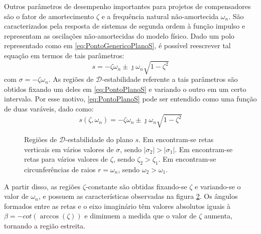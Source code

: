 Outros parâmetros de desempenho importantes para projetos de compensadores são o fator de amortecimento $\zeta$ e a frequência natural não-amortecida $\omega_n$. São caracterizados pela resposta de sistemas de segunda ordem à função impulso \cite{NISE2011}\cite{OGATA2011} e representam as oscilações não-amortecidas do modelo físico. Dado um polo representado como em \eqref{eq:PontoGenericoPlanoS}, é possível reescrever tal equação em termos de tais parâmetros:
\begin{equation}
  s = -\zeta\omega_n \pm \jmath\omega_n \sqrt {1-\zeta^2} \label{eq:PontoPlanoS}
\end{equation}
com $\sigma = -\zeta\omega_n$. As regiões de $\mathscr{D}$-estabilidade referente a tais parâmetros são obtidos fixando um deles em \eqref{eq:PontoPlanoS} e variando o outro em um certo intervalo. Por esse motivo, \eqref{eq:PontoPlanoS} pode ser entendido como uma função de duas varáveis, dado como:
\begin{equation}
  s(\zeta,\omega_n) = -\zeta\omega_n \pm \jmath\omega_n \sqrt {1-\zeta^2} \label{eq:FuncaoPontoPlanoS}
\end{equation}

\begin{figure}[!ht]
  \centering
  \begin{subfigure}[t]{0.3\columnwidth}
      
      \caption{}
      \label{subfig:EstabilidadeRelativaS}
  \end{subfigure}
  \begin{subfigure}[t]{0.3\columnwidth}
      
      \caption{}
      \label{subfig:TaxaDeAmortecimentoS}
  \end{subfigure}
  \begin{subfigure}[t]{0.3\columnwidth}
    
    \caption{}
    \label{subfig:OscilacaoNaoAmortecidaS}
  \end{subfigure}
  \caption{Regiões de $\mathscr{D}$-estabilidade do plano $s$. Em  encontram-se retas verticais em vários valores de $\sigma$, sendo $|\sigma_2| > |\sigma_1|$. Em  encontram-se retas para vários valores de $\zeta$, sendo $\zeta_2 > \zeta_1$. Em  encontram-se circunferências de raios $r = \omega_n$, sendo $\omega_2 > \omega_1$.}
  \label{fig:RegioesPlanoS}
\end{figure}

A partir disso, as regiões $\zeta$-constante são obtidas fixando-se $\zeta$ e variando-se o valor de $\omega_n$, e possuem as características observadas na figura \ref{subfig:TaxaDeAmortecimentoS}. Os ângulos formados entre as retas e o eixo imaginário têm valores absolutos iguais à $\beta = -cot{\left(\arccos{\left(\zeta\right)}\right)}$ e diminuem a medida que o valor de $\zeta$ aumenta, tornando a região estreita.

